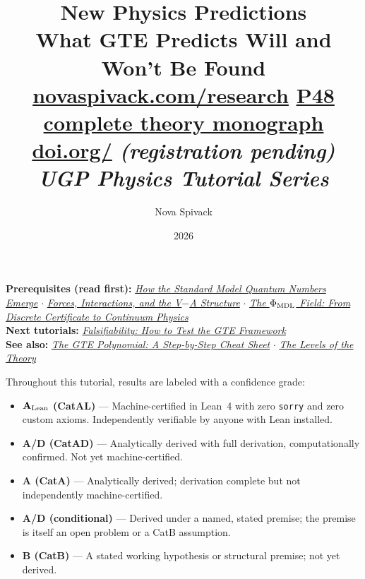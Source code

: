 \documentclass[11pt,a4paper]{article}
\date{2026}
\title{\textbf{New Physics Predictions}\\[6pt]
\large What GTE Predicts Will and Won't Be Found\\[8pt]
\normalsize
\href{https://novaspivack.com/research}{novaspivack.com/research}\texorpdfstring{\quad}{ }
\href{https://doi.org/10.5281/zenodo.20560550}{P48 complete theory monograph}\\[4pt]
\small\href{https://doi.org/\TutorialDOI}{doi.org/\TutorialDOI}
  \textit{(registration pending)}\\[4pt]
\normalsize\textit{UGP Physics Tutorial Series}}
\author{Nova Spivack}
\begin{document}
\setcounter{tocdepth}{2}
\maketitle
\tableofcontents
\newpage

\begin{tcolorbox}[colback=blue!6,colframe=blue!40!black,
  title=\textbf{UGP Physics Tutorial Series}]
\textbf{Prerequisites (read first):}
  \href{https://doi.org/10.5281/zenodo.20657898}%
    {\emph{How the Standard Model Quantum Numbers Emerge}}
  $\cdot$
  \href{https://doi.org/10.5281/zenodo.20669144}%
    {\emph{Forces, Interactions, and the V$-$A Structure}}
  $\cdot$
  \href{https://doi.org/10.5281/zenodo.20657885}%
    {\emph{The $\Phi_{\rm MDL}$ Field: From Discrete Certificate to Continuum Physics}}\\[4pt]
\textbf{Next tutorials:}
  \href{https://doi.org/10.5281/zenodo.20669142}%
    {\emph{Falsifiability: How to Test the GTE Framework}}\\[4pt]
\textbf{See also:}
  \href{https://doi.org/10.5281/zenodo.20657889}%
    {\emph{The GTE Polynomial: A Step-by-Step Cheat Sheet}}
  $\cdot$
  \href{https://doi.org/10.5281/zenodo.20657872}%
    {\emph{The Levels of the Theory}}
\end{tcolorbox}

\begin{tcolorbox}[colback=boxgreen,colframe=green!50!black,
  title=\textbf{Claim-Strength Taxonomy}]
Throughout this tutorial, results are labeled with a confidence grade:
\begin{itemize}[itemsep=2pt]
  \item \textbf{$\mathbf{A}_{\rm Lean}$ (CatAL)} --- Machine-certified in Lean~4 with zero \texttt{sorry} and zero custom axioms.  Independently verifiable by anyone with Lean installed.
  \item \textbf{A/D (CatAD)} --- Analytically derived with full derivation, computationally confirmed.  Not yet machine-certified.
  \item \textbf{A (CatA)} --- Analytically derived; derivation complete but not independently machine-certified.
  \item \textbf{A/D (conditional)} --- Derived under a named, stated premise; the premise is itself an open problem or a CatB assumption.
  \item \textbf{B (CatB)} --- A stated working hypothesis or structural premise; not yet derived.
\end{itemize}
\end{tcolorbox}
\end{document}
